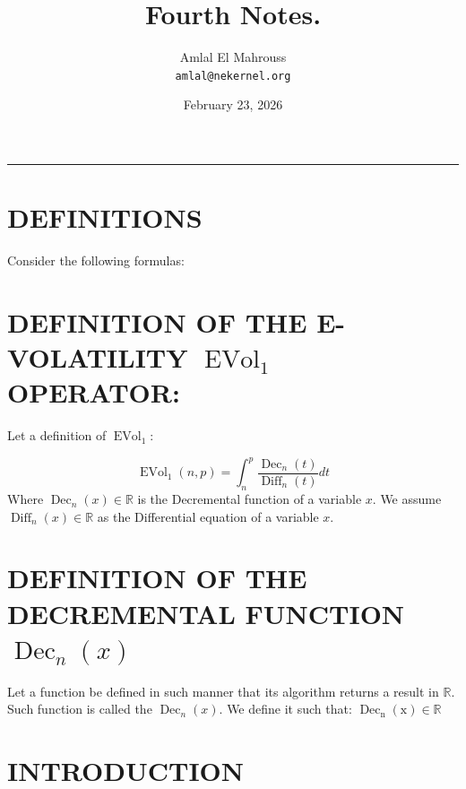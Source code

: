 \documentclass[11pt, a4paper]{article}
\title{Fourth Notes.}
\author{Amlal El Mahrouss\\\texttt{amlal@nekernel.org}}
\date{February 23, 2026}
\begin{document}
\maketitle

\begin{center}
	\rule[0.01cm]{17cm}{0.01cm}
\end{center}

\section{DEFINITIONS}

Consider the following formulas: 

\section{DEFINITION OF THE E-VOLATILITY $\operatorname{EVol}_{1}$ OPERATOR:}

Let a definition of $\operatorname{EVol}_{1}$:

\begin{equation}
    \operatorname{EVol}_{1}(n, p) = \int_{n}^{p} \frac{\operatorname{Dec}_{n}(t)}{\operatorname{Diff}_{n}(t)}dt
\end{equation}
Where $\operatorname{Dec}_{n}(x) \in \mathbb{R}$ is the Decremental function of a variable $x$. We assume $\operatorname{Diff}_{n}(x) \in \mathbb{R}$ as the Differential equation of a variable $x$.

\section{DEFINITION OF THE DECREMENTAL FUNCTION $\operatorname{Dec}_{n}(x)$}

Let a function be defined in such manner that its algorithm returns a result in $\mathbb{R}$. Such function is called the $\operatorname{Dec}_{n}(x)$. We define it such that: $ \operatorname{\operatorname{Dec}_{n}(x)} \in \mathbb{R}$

\section{INTRODUCTION}
\end{document}
